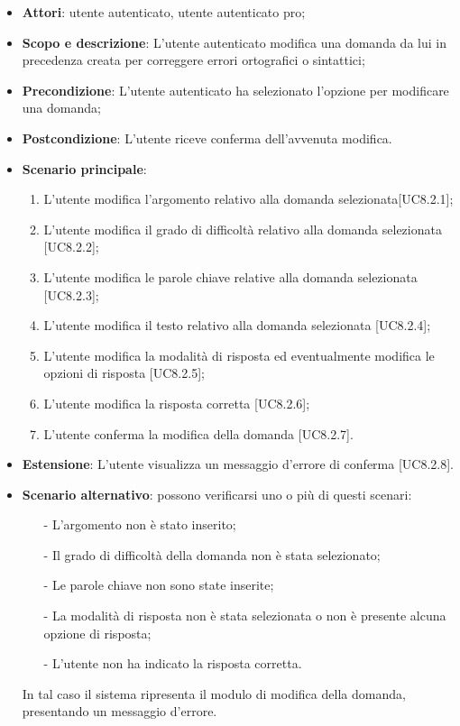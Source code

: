 	\begin{itemize}
		\item
			\textbf{Attori}: utente autenticato, utente autenticato pro;
		\item		
			\textbf{Scopo e descrizione}: L'utente autenticato modifica una domanda da lui in precedenza creata per correggere errori ortografici o sintattici;
		\item
			\textbf{Precondizione}: L'utente autenticato ha selezionato l'opzione per modificare una domanda;
		\item
			\textbf{	Postcondizione}: L'utente riceve conferma dell'avvenuta modifica.
		\item
			\textbf{Scenario principale}:
	       		\begin{enumerate}
					\item
					L'utente modifica l'argomento relativo alla domanda selezionata[UC8.2.1];
					\item
					L'utente modifica il grado di difficoltà relativo alla domanda selezionata [UC8.2.2];
					\item
					L'utente modifica le parole chiave relative alla domanda selezionata [UC8.2.3];
					\item
					L'utente modifica il testo relativo alla domanda selezionata [UC8.2.4];
					\item
					L'utente modifica la modalità di risposta ed eventualmente modifica le opzioni di risposta [UC8.2.5];
					\item
					L'utente modifica la risposta corretta [UC8.2.6];
					\item
					L'utente conferma la modifica della domanda [UC8.2.7].
	 			\end{enumerate}
	 	\item
			\textbf{Estensione}: L'utente visualizza un messaggio d'errore di conferma [UC8.2.8].
	 	\item
	 		\textbf{Scenario alternativo}: possono verificarsi uno o più di questi scenari:
				\begin{itemize}
					\item[-] 	
						L'argomento non è stato inserito;
					\item[-] 
    						Il grado di difficoltà della domanda non è stata selezionato;
					\item[-] 
						Le parole chiave non sono state inserite;
					\item[-] 
						La modalità di risposta non è stata selezionata o non è presente alcuna opzione di risposta; 
					\item[-]
						L'utente non ha indicato la risposta corretta.	
				\end{itemize}
			In tal caso il sistema ripresenta il modulo di modifica della domanda, presentando un messaggio d'errore.
	\end{itemize}
